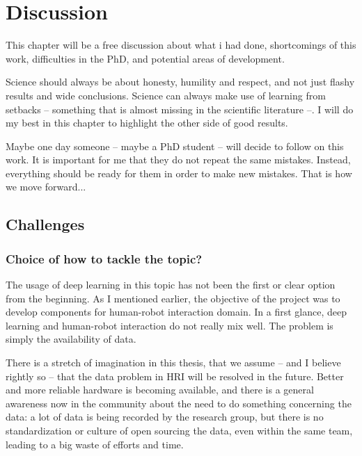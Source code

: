 \chapter{Discussion} \label{ch:discussion}

This chapter will be a free discussion about what i had done, shortcomings of this work, difficulties in the PhD, and potential areas of development.

Science should always be about honesty, humility and respect, and not just flashy results and wide conclusions. Science can always make use of learning from setbacks -- something that is almost missing in the scientific literature --. I will do my best in this chapter to highlight the other side of good results.

Maybe one day someone -- maybe a PhD student -- will decide to follow on this work. It is important for me that they do not repeat the same mistakes. Instead, everything should be ready for them in order to make new mistakes. That is how we move forward...

\clearpage

\section{Challenges}

\subsection{Choice of how to tackle the topic?}
\par The usage of deep learning in this topic has not been the first or clear option from the beginning. As I mentioned earlier, the objective of the project was to develop components for human-robot interaction domain. In a first glance, deep learning and human-robot interaction do not really mix well. The problem is simply the availability of data.

\par There is a stretch of imagination in this thesis, that we assume -- and I believe rightly so -- that the data problem in HRI will be resolved in the future. Better and more reliable hardware is becoming available, and there is a general awareness now in the community about the need to do something concerning the data: a lot of data is being recorded by the research group, but there is no standardization or culture of open sourcing the data, even within the same team, leading to a big waste of efforts and time.

